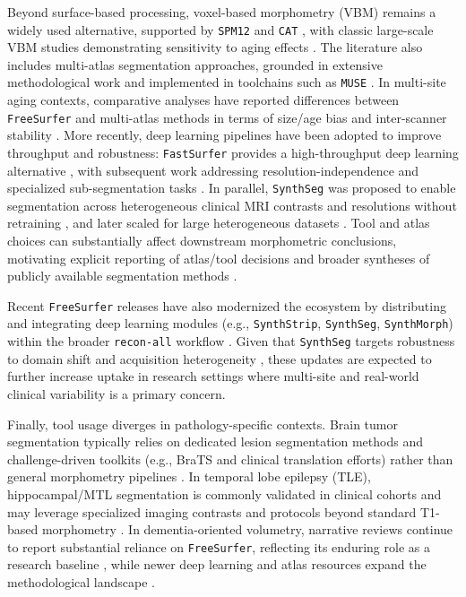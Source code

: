\documentclass{midl} %
\begin{document}
Beyond surface-based processing, voxel-based morphometry (VBM) remains a widely used alternative, supported by \texttt{SPM12} \citep{SPM12} and \texttt{CAT} \citep{Gaser2016,Gaser2024}, with classic large-scale VBM studies demonstrating sensitivity to aging effects \citep{Good2001}. The literature also includes multi-atlas segmentation approaches, grounded in extensive methodological work \citep{Iglesias2015} and implemented in toolchains such as \texttt{MUSE} \citep{Doshi2016}. In multi-site aging contexts, comparative analyses have reported differences between \texttt{FreeSurfer} and multi-atlas methods in terms of size/age bias and inter-scanner stability \citep{Srinivasan2020}. More recently, deep learning pipelines have been adopted to improve throughput and robustness: \texttt{FastSurfer} provides a high-throughput deep learning alternative \citep{Henschel2020}, with subsequent work addressing resolution-independence \citep{henschel2022fastsurfervinn} and specialized sub-segmentation tasks \citep{HenschelHypVINN2023}. In parallel, \texttt{SynthSeg} was proposed to enable segmentation across heterogeneous clinical MRI contrasts and resolutions without retraining \citep{Billot2021,Billot2023}, and later scaled for large heterogeneous datasets \citep{Billot2023PNAS}. Tool and atlas choices can substantially affect downstream morphometric conclusions, motivating explicit reporting of atlas/tool decisions \citep{AtlasComparison2020} and broader syntheses of publicly available segmentation methods \citep{BrainSegmentationReview2021}.

Recent \texttt{FreeSurfer} releases have also modernized the ecosystem by distributing and integrating deep learning modules (e.g., \texttt{SynthStrip}, \texttt{SynthSeg}, \texttt{SynthMorph}) within the broader \texttt{recon-all} workflow \citep{FreeSurferReleaseNotes8.0}. Given that \texttt{SynthSeg} targets robustness to domain shift and acquisition heterogeneity \citep{Billot2023,Billot2023PNAS}, these updates are expected to further increase uptake in research settings where multi-site and real-world clinical variability is a primary concern.

Finally, tool usage diverges in pathology-specific contexts. Brain tumor segmentation typically relies on dedicated lesion segmentation methods and challenge-driven toolkits (e.g., BraTS and clinical translation efforts) rather than general morphometry pipelines \citep{BraTSToolkit2020,BraTS2024,BraTS2024Meningioma,Hasan2023}. In temporal lobe epilepsy (TLE), hippocampal/MTL segmentation is commonly validated in clinical cohorts and may leverage specialized imaging contrasts and protocols beyond standard T1-based morphometry \citep{TLESegmentation2018,Peixoto2024}. In dementia-oriented volumetry, narrative reviews continue to report substantial reliance on \texttt{FreeSurfer}, reflecting its enduring role as a research baseline \citep{Khadhraoui2024}, while newer deep learning and atlas resources expand the methodological landscape \citep{Casamitjana2025}.
\end{document}
